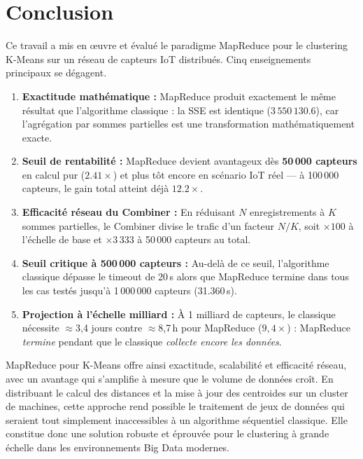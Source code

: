 \documentclass[12pt,a4paper]{article}
\begin{document}
\section{Conclusion}

Ce travail a mis en œuvre et évalué le paradigme MapReduce pour le clustering K-Means
sur un réseau de capteurs IoT distribués. Cinq enseignements principaux se dégagent.

\begin{enumerate}

\item \textbf{Exactitude mathématique :} MapReduce produit exactement le même résultat
que l'algorithme classique : la SSE est identique ($3\,550\,130.6$), car l'agrégation
par sommes partielles est une transformation mathématiquement exacte.

\item \textbf{Seuil de rentabilité :} MapReduce devient avantageux dès \textbf{50\,000
capteurs} en calcul pur ($2.41\times$) et plus tôt encore en scénario IoT réel —
à 100\,000 capteurs, le gain total atteint déjà $12.2\times$.

\item \textbf{Efficacité réseau du Combiner :} En réduisant $N$ enregistrements à $K$
sommes partielles, le Combiner divise le trafic d'un facteur $N/K$, soit $\times 100$
à l'échelle de base et $\times 3\,333$ à 50\,000 capteurs au total.

\item \textbf{Seuil critique à 500\,000 capteurs :} Au-delà de ce seuil, l'algorithme
classique dépasse le timeout de 20\,s alors que MapReduce termine dans tous les cas
testés jusqu'à 1\,000\,000 capteurs (31.360\,s).

\item \textbf{Projection à l'échelle milliard :} À 1 milliard de capteurs, le classique
nécessite $\approx$3,4 jours contre $\approx$8,7\,h pour MapReduce ($9{,}4\times$) :
MapReduce \emph{termine} pendant que le classique \emph{collecte encore les données}.

\end{enumerate}

MapReduce pour K-Means offre ainsi exactitude, scalabilité et efficacité réseau,
avec un avantage qui s'amplifie à mesure que le volume de données croît.
En distribuant le calcul des distances et la mise à jour des centroides sur un cluster
de machines, cette approche rend possible le traitement de jeux de données qui seraient
tout simplement inaccessibles à un algorithme séquentiel classique. Elle constitue donc
une solution robuste et éprouvée pour le clustering à grande échelle dans les
environnements Big Data modernes.
\end{document}
